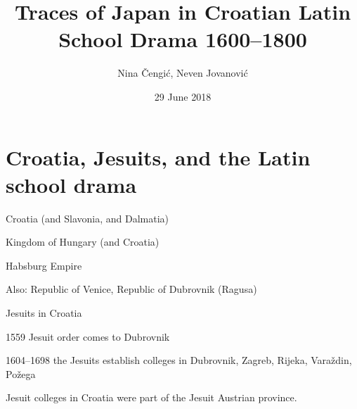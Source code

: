 \documentclass[14pt]{beamer}
\title{Traces of Japan in Croatian Latin School Drama 1600–1800}
\date{29 June 2018}
\author{Nina Čengić, Neven Jovanović}
\institute{University of Zagreb, Faculty of Humanities and Social Sciences}
\begin{document}
  \maketitle
  


\begin{frame}
\tableofcontents
\end{frame}

\section{Croatia, Jesuits, and the Latin school drama}

{
    \begin{frame}[plain]
    \end{frame}
    }


\begin{frame}

Croatia (and Slavonia, and Dalmatia)

Kingdom of Hungary (and Croatia)

Habsburg Empire

Also: Republic of Venice, Republic of Dubrovnik (Ragusa)

\end{frame}


\begin{frame}{Jesuits in Croatia}

\alert{1559} Jesuit order comes to Dubrovnik

\alert{1604–1698} the Jesuits establish colleges in Dubrovnik, Zagreb, Rijeka, Varaždin, Požega

Jesuit colleges in Croatia were part of the Jesuit Austrian province.

\end{frame}
\end{document}
